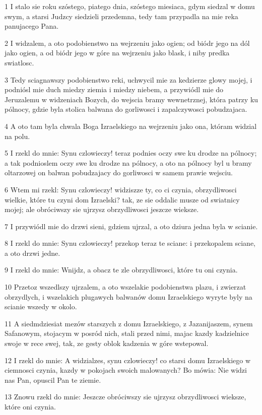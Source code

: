 \par 1 I stalo sie roku szóstego, piatego dnia, szóstego miesiaca, gdym siedzal w domu swym, a starsi Judzcy siedzieli przedemna, tedy tam przypadla na mie reka panujacego Pana.
\par 2 I widzalem, a oto podobienstwo na wejrzeniu jako ogien; od biódr jego na dól jako ogien, a od biódr jego w góre na wejrzeniu jako blask, i niby predka swiatlosc.
\par 3 Tedy sciagnawszy podobienstwo reki, uchwycil mie za kedzierze glowy mojej, i podniósl mie duch miedzy ziemia i miedzy niebem, a przywiódl mie do Jeruzalemu w widzeniach Bozych, do wejscia bramy wewnetrznej, która patrzy ku pólnocy, gdzie byla stolica balwana do gorliwosci i zapalczywosci pobudzajaca.
\par 4 A oto tam byla chwala Boga Izraelskiego na wejrzeniu jako ona, któram widzial na polu.
\par 5 I rzekl do mnie: Synu czlowieczy! teraz podnies oczy swe ku drodze na pólnocy; a tak podnioslem oczy swe ku drodze na pólnocy, a oto na pólnocy byl u bramy oltarzowej on balwan pobudzajacy do gorliwosci w samem prawie wejsciu.
\par 6 Wtem mi rzekl: Synu czlowieczy! widziszze ty, co ci czynia, obrzydliwosci wielkie, które tu czyni dom Izraelski? tak, ze sie oddalic musze od swiatnicy mojej; ale obróciwszy sie ujrzysz obrzydliwosci jeszcze wieksze.
\par 7 I przywiódl mie do drzwi sieni, gdziem ujrzal, a oto dziura jedna byla w scianie.
\par 8 I rzekl do mnie: Synu czlowieczy! przekop teraz te sciane: i przekopalem sciane, a oto drzwi jedne.
\par 9 I rzekl do mnie: Wnijdz, a obacz te zle obrzydliwosci, które tu oni czynia.
\par 10 Przetoz wszedlszy ujrzalem, a oto wszelakie podobienstwa plazu, i zwierzat obrzydlych, i wszelakich plugawych balwanów domu Izraelskiego wyryte byly na scianie wszedy w okolo.
\par 11 A siedmdziesiat mezów starszych z domu Izraelskiego, z Jazanijaszem, synem Safanowym, stojacym w posród nich, stali przed nimi, majac kazdy kadzielnice swoje w rece swej, tak, ze gesty oblok kadzenia w góre wstepowal.
\par 12 I rzekl do mnie: A widzialzes, synu czlowieczy! co starsi domu Izraelskiego w ciemnosci czynia, kazdy w pokojach swoich malowanych? Bo mówia: Nie widzi nas Pan, opuscil Pan te ziemie.
\par 13 Znowu rzekl do mnie: Jeszcze obróciwszy sie ujrzysz obrzydliwosci wieksze, które oni czynia.
